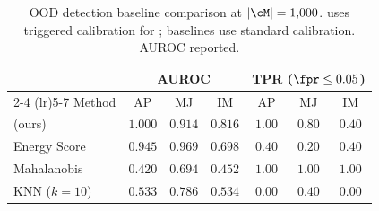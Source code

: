\begin{table}[h]
  \centering
  \small
  \caption{OOD detection baseline comparison at $|\cM|=1{,}000$. \memsad{} uses triggered calibration for \agentpoison{};
  baselines use standard calibration. AUROC reported.}
  \label{tab:ood_comparison}
  \begin{tabular}{l ccc ccc}
    \toprule
    & \multicolumn{3}{c}{AUROC} & \multicolumn{3}{c}{TPR ($\fpr \leq 0.05$)} \\
    \cmidrule(lr){2-4} \cmidrule(lr){5-7}
    Method & AP & MJ & IM & AP & MJ & IM \\
    \midrule
    \memsad{} (ours) & $1.000$ & $0.914$ & $0.816$ & $1.00$ & $0.80$ & $0.40$ \\
    Energy Score & $0.945$ & $0.969$ & $0.698$ & $0.40$ & $0.20$ & $0.40$ \\
    Mahalanobis & $0.420$ & $0.694$ & $0.452$ & $1.00$ & $1.00$ & $1.00$ \\
    KNN ($k=10$) & $0.533$ & $0.786$ & $0.534$ & $0.00$ & $0.40$ & $0.00$ \\
    \bottomrule
  \end{tabular}
\end{table}
